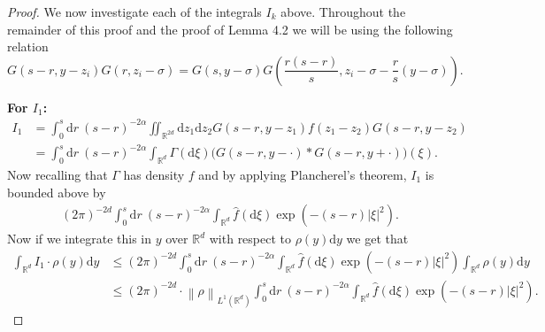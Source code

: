 \documentclass[a4paper,11pt]{article}%
\numberwithin{equation}{section}
\theoremstyle{plain}
\theoremstyle{definition}
\newcommand{\R}{\mathbb{R}}
\newcommand{\Norm}[1]{\left\|  #1   \right\|}
\newcommand{\ud}{\ensuremath{ \mathrm{d} }}
\begin{document}
\begin{proof}
	We now investigate each of the integrals $I_k$ above. Throughout the remainder of this proof and the proof of Lemma 4.2 we will be using the following relation
	\begin{equation}
	\label{E:gsim}
	G(s-r,y-z_i)G(r,z_i-\sigma)=G(s,y-\sigma)G\left(\dfrac{r(s-r)}{s},z_i-\sigma-\dfrac{r}{s}(y-\sigma)\right) .
	\end{equation}

	\noindent \textbf{For $I_1$:}
	\begin{align*}
	I_1 & = \int_0^s \ud r \: (s-r)^{-2\alpha} \iint_{\R^{2d}} \ud z_1\ud z_2 G(s-r,y-z_1)f(z_1-z_2)G(s-r,y-z_2)
	\\  & = \int_0^s \ud r \: (s-r)^{-2\alpha} \int_{\R^{d}} \Gamma(\ud \xi) \big(G(s-r,y-\cdot)*G(s-r,y+\cdot)\big)(\xi).
	\end{align*}
	Now recalling that $\Gamma$ has density $f$ and by applying Plancherel's theorem, $I_1$ is bounded above by
	\begin{align*}
	(2\pi)^{-2d}\int_0^s \ud r \: (s-r)^{-2\alpha} \int_{\R^{d}} \widehat{f}(\ud \xi) \exp\left(-(s-r)|\xi|^2 \right).
	\end{align*}
	Now if we integrate this in $y$ over $\R^d$ with respect to $\rho(y)\ud y$ we get that
	\begin{align*}
	\int_{\R^d}I_1\cdot \rho(y)\ud y &\le (2\pi)^{-2d} \int_0^s \ud r \: (s-r)^{-2\alpha} \int_{\R^{d}} \widehat{f}(\ud \xi) \exp\left(-(s-r)|\xi|^2 \right)  \int_{\R^d}\rho(y)\ud y
	\\ &\le (2\pi)^{-2d}\cdot \Norm{\rho}_{L^1(\R^d)} \int_0^s \ud r \: (s-r)^{-2\alpha} \int_{\R^{d}} \widehat{f}(\ud \xi) \exp\left(-(s-r)|\xi|^2 \right) .
	\end{align*}



\end{proof}
\end{document}
